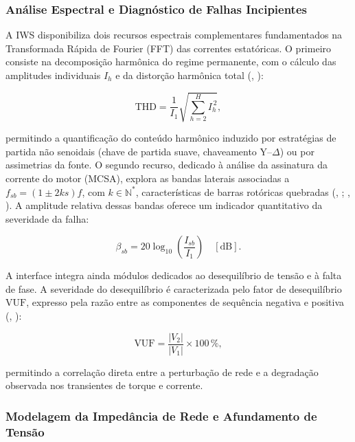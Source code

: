 \documentclass[a4paper]{ifacconf}
\begin{document}
\subsubsection{Análise Espectral e Diagnóstico de Falhas Incipientes}

A IWS disponibiliza dois recursos espectrais complementares fundamentados na Transformada Rápida de Fourier (FFT) das correntes estatóricas. O primeiro consiste na decomposição harmônica do regime permanente, com o cálculo das amplitudes individuais $I_h$ e da distorção harmônica total (\citeauthor{mohapatra2019steady}, \citeyear{mohapatra2019steady}):

\begin{equation}
\label{eq:thd}
\text{THD} = \frac{1}{I_1}\sqrt{\sum_{h=2}^{H} I_h^{\,2}},
\end{equation}

\noindent permitindo a quantificação do conteúdo harmônico induzido por estratégias de partida não senoidais (chave de partida suave, chaveamento Y--$\Delta$) ou por assimetrias da fonte. O segundo recurso, dedicado à análise da assinatura da corrente do motor (MCSA), explora as bandas laterais associadas a $f_{sb} = (1 \pm 2ks)f$, com $k \in \mathbb{N}^{*}$, características de barras rotóricas quebradas (\citeauthor{arkan2005modelling}, \citeyear{arkan2005modelling}; \citeauthor{tuanmohamad2024advance}, \citeyear{tuanmohamad2024advance}). A amplitude relativa dessas bandas oferece um indicador quantitativo da severidade da falha:

\begin{equation}
\label{eq:mcsa_severity}
\beta_{sb} = 20\log_{10}\!\left(\frac{I_{sb}}{I_1}\right) \quad [\mathrm{dB}].
\end{equation}

A interface integra ainda módulos dedicados ao desequilíbrio de tensão e à falta de fase. A severidade do desequilíbrio é caracterizada pelo fator de desequilíbrio $\text{VUF}$, expresso pela razão entre as componentes de sequência negativa e positiva (\citeauthor{karakas2009aggregation}, \citeyear{karakas2009aggregation}):

\begin{equation}
\label{eq:vuf}
\text{VUF} = \frac{|V_2|}{|V_1|} \times 100\,\%,
\end{equation}

\noindent permitindo a correlação direta entre a perturbação de rede e a degradação observada nos transientes de torque e corrente.

\subsubsection{Modelagem da Impedância de Rede e Afundamento de Tensão}
\end{document}
